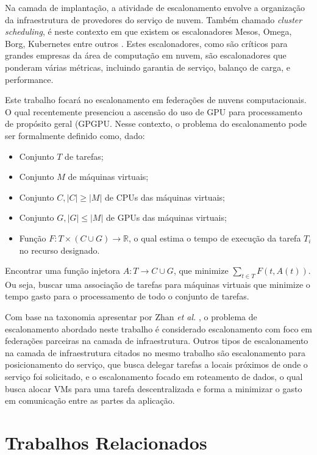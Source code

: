 Na camada de implantação, a atividade de escalonamento envolve a organização da infraestrutura de provedores do serviço de nuvem. Também chamado \textit{cluster scheduling}, é neste contexto em que existem os escalonadores Mesos, Omega, Borg, Kubernetes entre outros \cite{EscalonadoresDeCluster}. Estes escalonadores, como são críticos para grandes empresas da área de computação em nuvem, são escalonadores que ponderam várias métricas, incluindo garantia de serviço, balanço de carga, e performance.

Este trabalho focará no escalonamento em federações de nuvens computacionais. O qual recentemente presenciou a ascensão do uso de \acrfull{GPU} para processamento de propósito geral (\acrfull{GPGPU}\cite{Dimitrov:2009:USA:1513895.1513907}\cite{Yang:2010:GCM:1809028.1806606}. Nesse contexto, o problema do escalonamento pode ser formalmente definido como, dado:

\begin{itemize}
	\item Conjunto $T$ de tarefas;
	\item Conjunto $M$ de máquinas virtuais;
	\item Conjunto $C, |C| \ge |M|$ de CPUs das máquinas virtuais;
	\item Conjunto $G,  |G| \le |M|$ de GPUs das máquinas virtuais;
	\item Função $F: T \times (C \cup G) \to \mathbb{R}$, o qual estima o tempo de execução da tarefa $T_{i}$ no recurso designado.
\end{itemize}
Encontrar uma função injetora $A: T \to C \cup G$, que minimize $\sum_{t \in T} F(t, A(t) )$. Ou seja, buscar uma associação de tarefas para máquinas virtuais que minimize o tempo gasto para o processamento de todo o conjunto de tarefas.

Com base na taxonomia apresentar por Zhan \textit{et al.} \cite{Zhan:2015:CCR:2775083.2788397}, o problema de escalonamento abordado neste trabalho é considerado escalonamento com foco em federações parceiras na camada de infraestrutura. Outros tipos de escalonamento na camada de infraestrutura citados no mesmo trabalho são escalonamento para posicionamento do serviço, que busca delegar tarefas a locais próximos de onde o serviço foi solicitado, e o escalonamento focado em roteamento de dados, o qual busca alocar \acrshort{VM}s para uma tarefa descentralizada e forma a minimizar o gasto em comunicação entre as partes da aplicação.

\section{Trabalhos Relacionados}

